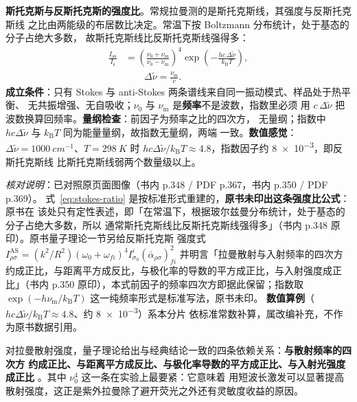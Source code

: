 \begin{principle}
\textbf{斯托克斯与反斯托克斯的强度比}。常规拉曼测的是斯托克斯线，其强度与反斯托克斯线
之比由两能级的布居数比决定。常温下按 Boltzmann 分布统计，处于基态的分子占绝大多数，
故斯托克斯线比反斯托克斯线强得多：
\begin{equation}
\begin{aligned}
\frac{I_{\mathrm{as}}}{I_{\mathrm{s}}}
&=\left(\frac{\nu_0+\nu_{\mathrm{m}}}{\nu_0-\nu_{\mathrm{m}}}\right)^{\!4}
\exp\!\left(-\frac{h c\,\Delta\tilde\nu}{k_{\mathrm{B}}T}\right),\\[1pt]
&\qquad \Delta\tilde\nu=\frac{\nu_{\mathrm{m}}}{c} .
\end{aligned}
\label{eq:stokes-ratio}
\end{equation}
\textbf{成立条件}：只有 Stokes 与 anti-Stokes 两条谱线来自同一振动模式、样品处于热平衡、
无共振增强、无自吸收；$\nu_0$ 与 $\nu_{\mathrm{m}}$ 是\textbf{频率}不是波数，指数里必须
用 $c\,\Delta\tilde\nu$ 把波数换算回频率。\textbf{量纲检查}：前因子为频率之比的四次方，
无量纲；指数中 $hc\Delta\tilde\nu$ 与 $k_{\mathrm{B}}T$ 同为能量量纲，故指数无量纲，两端
一致。\textbf{数值感觉}：$\Delta\tilde\nu=\qty{1000}{cm^{-1}}$、$T=\qty{298}{K}$ 时
$hc\Delta\tilde\nu/k_{\mathrm{B}}T\approx4.8$，指数因子约 \num{8e-3}，即反斯托克斯线
比斯托克斯线弱两个数量级以上。
\end{principle}

\emph{核对说明}：已对照原页面图像（书内 p.348 / PDF p.367，书内 p.350 / PDF p.369）。
式~\eqref{eq:stokes-ratio} 是按标准形式重建的，\textbf{原书未印出这条强度比公式}：原书在
该处只有定性表述，即「在常温下，根据玻尔兹曼分布统计，处于基态的分子占绝大多数，所以
通常斯托克斯线比反斯托克斯线强得多」（书内 p.348 原印）。原书量子理论一节另给反斯托克斯
强度式 $I^{\mathrm{AS}}_{\rho\sigma}=(k^{2}/R^{2})(\omega_{0}+\omega_{fi})^{4}
I^{i}_{\sigma_{0}}(\bar{\alpha}_{\rho\sigma})^{2}_{fi}$ 并明言「拉曼散射与入射频率的四次方
约成正比，与距离平方成反比，与极化率的导数的平方成正比，与入射强度成正比」（书内 p.350
原印），本式前因子的频率四次方即据此保留；指数取
$\exp(-h\nu_{\mathrm{m}}/k_{\mathrm{B}}T)$ 这一纯频率形式是标准写法，原书未印。
\textbf{数值算例}（$hc\Delta\tilde\nu/k_{\mathrm{B}}T\approx4.8$、约 \num{8e-3}）系本分片
依标准常数补算，属改编补充，不作为原书数据引用。

对拉曼散射强度，量子理论给出与经典结论一致的四条依赖关系：\textbf{与散射频率的四次方
约成正比、与距离平方成反比、与极化率导数的平方成正比、与入射光强度成正比}
。其中 $\nu_0^4$ 这一条在实验上最要紧：它意味着
用短波长激发可以显著提高散射强度，这正是紫外拉曼除了避开荧光之外还有灵敏度收益的原因。

